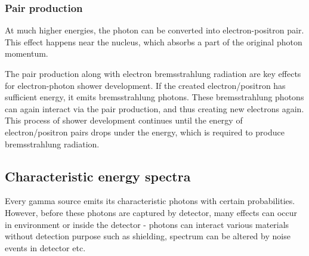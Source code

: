 \subsubsection{Pair production}
At much higher energies, the photon can be converted into electron-positron pair. This effect happens near the nucleus, which absorbs a part of the original photon momentum.
\par
The pair production along with electron bremsstrahlung radiation  are key effects for electron-photon shower development. If the created electron/positron has sufficient energy, it emits bremsstrahlung photons. These bremsstrahlung photons can again interact via the pair production, and thus creating new electrons again. This process of shower development continues until the energy of electron/positron pairs drops under the energy, which is required to produce bremsstrahlung radiation. 


\subsection{Characteristic energy spectra}
Every gamma source emits its characteristic photons with certain probabilities. However, before these photons are captured by detector, many effects can occur in environment or inside the detector - photons can interact various materials without detection purpose such as shielding, spectrum can be altered by 
noise events in detector etc.


